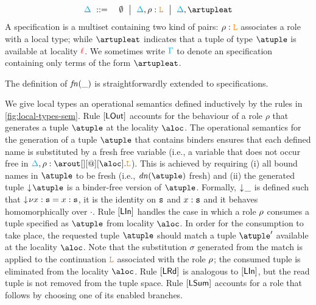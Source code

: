 \begin{eqnarray*}
  \envmv & \bnfdef & \emptyset \bnfmid
                  \envmv, \arole :  \aL \bnfmid
                  \envmv, \artupleat                  
\end{eqnarray*}
%
A specification is a multiset containing two kind of pairs:  $\rho :  \texttt{\textcolor{orange}L}$   associates a 
role with a local type; while $\artupleat$  indicates that a 
tuple of type $\atuple$ is available at locality ${\color{red}\ell}$. 
%
We sometimes write $\textcolor{cyan}{\Gamma}$ to denote an specification containing only
terms of the form $\artupleat$. 

The definition of ${\it fn}(\_)$ is straightforwardly  extended to specifications. 

We give local types  an operational semantics defined inductively by 
the rules in \cref{fig:local-types-sem}. Rule $\mathsf{[LOut]}$ 
accounts  for the behaviour of a role $\rho$ that  generates a tuple $\atuple$ at the 
locality $\aloc$. The operational semantics for the generation of a tuple $\atuple$ that 
contains binders ensures that  each defined name  is substituted by a fresh free variable 
 (i.e., a variable that does not occur free in $\envmv, \arole : \arout[][@][\aloc].\aL$).
This is achieved by requiring  (i) all bound names in $\atuple$ to be fresh (i.e., $\dn\atuple$  fresh) and 
(ii)  the generated tuple $\eraseB\atuple$ is a binder-free version of $\atuple$. 
Formally, $\downarrow\!{\_}$ is defined  such that 
$\downarrow\!{\nu x:\mathtt{s}} = x : \mathtt{s}$,  it is the identity on $\mathtt{s}$ and $x : \mathtt{s}$ and it behaves 
homomorphically over $\cdot$. Rule $\mathsf{[LIn]}$ handles the case in which a role $\rho$
consumes  a tuple specified as $\atuple$ from locality $\aloc$. In order for the consumption to
take place, the  requested tuple $\atuple$ should match  a tuple $\atuple'$ available 
at the locality $\aloc$. 
Note that the substitution $\sigma$ generated from the match is applied 
to the continuation $\texttt{\textcolor{orange}L}$ associated with the role $\rho$; the
consumed tuple is eliminated from the locality $\aloc$. 
%
Rule $\mathsf{[LRd]}$ is analogous to $\mathsf{[LIn]}$, but the 
read tuple is not removed from the tuple space.
%
Rule $\mathsf{[LSum]}$ accounts for a role that follows by choosing one of 
its enabled branches. 


